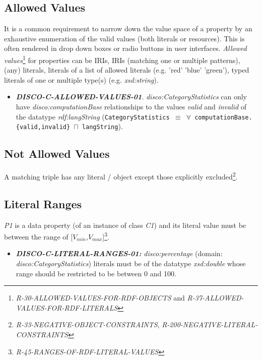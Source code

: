 \documentclass{llncs}
\newcommand{\ms}[1]{\texttt{#1}}
\begin{document}
\subsection{Allowed Values}

It is a common requirement to narrow down the value space of a property by an exhaustive enumeration of the valid values (both literals or resources). 
This is often rendered in drop down boxes or radio buttons in user interfaces. 
\emph{Allowed values}\footnote{{\em R-30-ALLOWED-VALUES-FOR-RDF-OBJECTS} and 
{\em R-37-ALLOWED-VALUES-FOR-RDF-LITERALS}} for properties can be IRIs, IRIs (matching one or multiple patterns), (any) literals, literals of a list of allowed literals (e.g. 'red' 'blue' 'green'), typed literals of one or multiple type(s) (e.g. \emph{xsd:string}).

\begin{itemize}
	\item \textbf{{\em DISCO-C-ALLOWED-VALUES-01}}.
{\em disco:CategoryStatistics} can only have {\em disco:computationBase} relationships to the values \emph{valid} and \emph{invalid} of the datatype {\em rdf:langString} (\ms{CategoryStatistics $\equiv$ $\forall$ computationBase.\{valid,invalid\} $\sqcap$ langString}).
\end{itemize}

\subsection{Not Allowed Values}

A matching triple has any literal / object except those explicitly excluded\footnote{\emph{R-33-NEGATIVE-OBJECT-CONSTRAINTS}, \emph{R-200-NEGATIVE-LITERAL-CONSTRAINTS}}.

\subsection{Literal Ranges}

\emph{P1} is a data property (of an instance of class \emph{C1}) and its literal value must be between the range of [$V_{min}$,$V_{max}$]\footnote{{\em R-45-RANGES-OF-RDF-LITERAL-VALUES}}.

\begin{itemize}
	\item \textbf{{\em DISCO-C-LITERAL-RANGES-01:}}
{\em disco:percentage} (domain: {\em disco:CategoryStatistics}) literals must be of the datatype {\em xsd:double} whose range should be restricted to be between 0 and 100.
\end{itemize}
\end{document}
